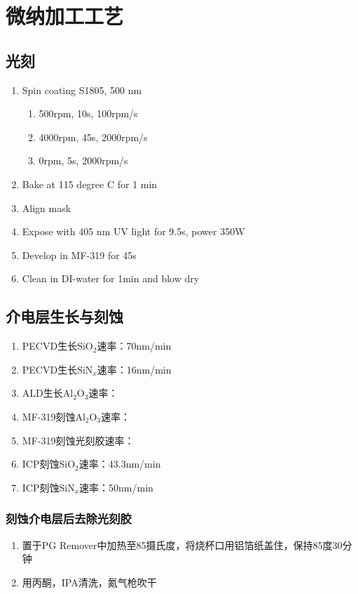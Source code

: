 \chapter{微纳加工工艺} %
\label{cha:fabrication}

\section{光刻} %
\label{sec:光刻}
    \begin{enumerate}
        \item Spin coating S1805, 500 nm
        \begin{enumerate}
            \item 500rpm, 10s, 100rpm/s
            \item 4000rpm, 45s, 2000rpm/s
            \item 0rpm, 5s, 2000rpm/s
        \end{enumerate}
        \item Bake at 115 degree C for 1 min
        \item Align mask
        \item Expose with 405 nm UV light for 9.5s, power 350W
        \item Develop in MF-319 for 45s
        \item Clean in DI-water for 1min and blow dry
    \end{enumerate}

\section{介电层生长与刻蚀} %
\label{sec:介电层生长与刻蚀}
    \begin{enumerate}
        \item PECVD生长SiO$_2$速率：70nm/min
        \item PECVD生长SiN$_x$速率：16nm/min
        \item ALD生长Al$_2$O$_3$速率：
        \item MF-319刻蚀Al$_2$O$_3$速率：
        \item MF-319刻蚀光刻胶速率：
        \item ICP刻蚀SiO$_2$速率：43.3nm/min
        \item ICP刻蚀SiN$_x$速率：50nm/min
    \end{enumerate}
    \subsection{刻蚀介电层后去除光刻胶} %
    \label{sub:刻蚀介电层后去除光刻胶}
        \begin{enumerate}
            \item 置于PG Remover中加热至85摄氏度，将烧杯口用铝箔纸盖住，保持85度30分钟
            \item 用丙酮，IPA清洗，氮气枪吹干
        \end{enumerate}

